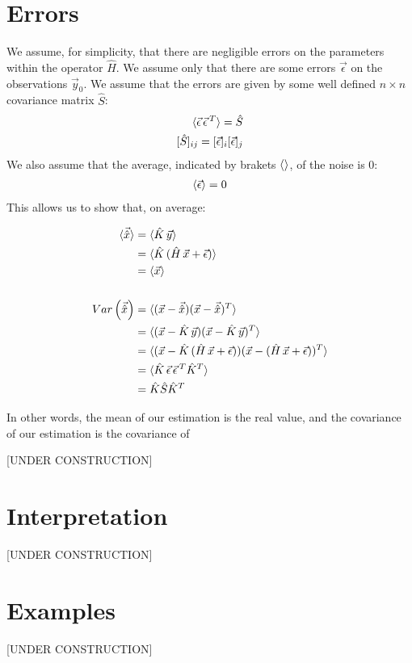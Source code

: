 \section{Errors}

We assume, for simplicity, that there are negligible errors on the parameters within the operator $\hat{H}$. We assume only that there are some errors $\vec{\epsilon}$ on the observations $\vec{y}_0$. We assume that the errors are given by some well defined $n\times n$ covariance matrix $\hat{S}$:
\begin{align*}
    \braket{\vec{\epsilon}\,\vec{\epsilon}\,^T}=\hat{S}\\
    [\hat{S}]_{ij}=[\vec{\epsilon}]_i[\vec{\epsilon}]_j
\end{align*}
We also assume that the average, indicated by brakets $\braket{}$, of the noise is $0$:
\begin{align*}
    \braket{\vec{\epsilon}}=0
\end{align*}
This allows us to show that, on average:

\begin{align*}
    \braket{\vec{\hat{x}}}&=\braket{\hat{K}\,\vec{y}}
    \\
    &=\braket{\hat{K}\,(\hat{H}\,\vec{x}+\vec{\epsilon})}
    \\
    &=\braket{\vec{x}}
    \\
    \\
    Var\left(\vec{\hat{x}}\right)&
    =\braket{(\vec{x}-\vec{\hat{x}})(\vec{x}-\vec{\hat{x}})^T}
    \\
    &=\braket{(\vec{x}-\hat{K}\,\vec{y})(\vec{x}-\hat{K}\,\vec{y})^T}
    \\
    &
    =\braket{(\vec{x}-\hat{K}\,(\hat{H}\,\vec{x}+\vec{\epsilon}))(\vec{x}-(\hat{H}\,\vec{x}+\vec{\epsilon}))^T}
    \\
    &=\braket{\hat{K}\,\vec{\epsilon}\,\vec{\epsilon}\,^T\hat{K}^T}
    \\
    &=\hat{K}\hat{S}\hat{K}^T
\end{align*}

In other words, the mean of our estimation is the real value, and the covariance of our estimation is the covariance of 

[UNDER CONSTRUCTION]

\section{Interpretation}

[UNDER CONSTRUCTION]

\section{Examples}

[UNDER CONSTRUCTION]